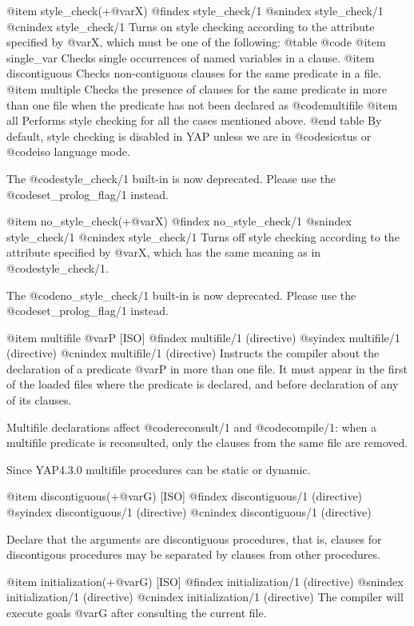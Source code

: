 {{{{@item style_check(+@var{X})
@findex style_check/1
@snindex style_check/1
@cnindex style_check/1
Turns on style checking according to the attribute specified by @var{X},
which must be one of the following:
@table @code
@item single_var
Checks single occurrences of named variables in a clause.
@item discontiguous
Checks non-contiguous clauses for the same predicate in a file.
@item multiple
Checks the presence of clauses for the same predicate in more than one
file when the predicate has not been declared as @code{multifile}
@item all
Performs style checking for all the cases mentioned above.
@end table
By default, style checking is disabled in YAP unless we are in
@code{sicstus} or @code{iso} language mode.

The @code{style_check/1} built-in is now deprecated. Please use the
@code{set_prolog_flag/1} instead.

@item no_style_check(+@var{X})
@findex no_style_check/1
@snindex style_check/1
@cnindex style_check/1
Turns off style checking according to the attribute specified by
@var{X}, which has the same meaning as in @code{style_check/1}.

The @code{no_style_check/1} built-in is now deprecated. Please use the
@code{set_prolog_flag/1} instead.

@item multifile @var{P} [ISO]
@findex multifile/1 (directive)
@syindex multifile/1 (directive)
@cnindex multifile/1 (directive)
Instructs the compiler about the declaration of a predicate @var{P} in
more than one file. It must appear in the first of the loaded files
where the predicate is declared, and before declaration of any of its
clauses.

Multifile declarations affect @code{reconsult/1} and @code{compile/1}:
when a multifile predicate is reconsulted, only the clauses from the
same file are removed.

Since YAP4.3.0 multifile procedures can be static or dynamic.

@item discontiguous(+@var{G}) [ISO]
@findex discontiguous/1 (directive)
@syindex discontiguous/1 (directive)
@cnindex discontiguous/1 (directive)

Declare that the arguments are discontiguous procedures, that is,
clauses for discontigous procedures may be separated by clauses from
other procedures.

@item initialization(+@var{G}) [ISO]
@findex initialization/1 (directive)
@snindex initialization/1 (directive)
@cnindex initialization/1 (directive)
The compiler will execute goals @var{G} after consulting the current
file.

}}}}
